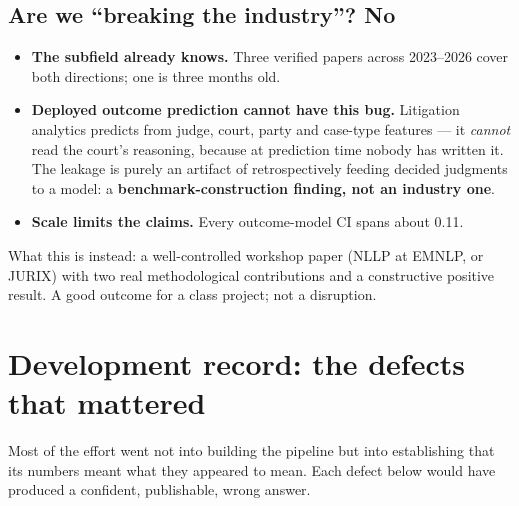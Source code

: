 \documentclass[12pt,a4paper]{article}
\begin{document}
\subsection{Are we ``breaking the industry''? No}

\begin{itemize}
\item \textbf{The subfield already knows.} Three verified papers across 2023--2026 cover both
directions; one is three months old.
\item \textbf{Deployed outcome prediction cannot have this bug.} Litigation analytics predicts from
judge, court, party and case-type features --- it \emph{cannot} read the court's reasoning, because at
prediction time nobody has written it. The leakage is purely an artifact of retrospectively feeding
decided judgments to a model: a \textbf{benchmark-construction finding, not an industry one}.
\item \textbf{Scale limits the claims.} Every outcome-model CI spans about 0.11.
\end{itemize}

\noindent
What this is instead: a well-controlled workshop paper (NLLP at EMNLP, or JURIX) with two real
methodological contributions and a constructive positive result. A good outcome for a class project;
not a disruption.

\section{Development record: the defects that mattered}\label{sec:engineering}

Most of the effort went not into building the pipeline but into establishing that its numbers meant
what they appeared to mean. Each defect below would have produced a confident, publishable, wrong
answer.
\end{document}

